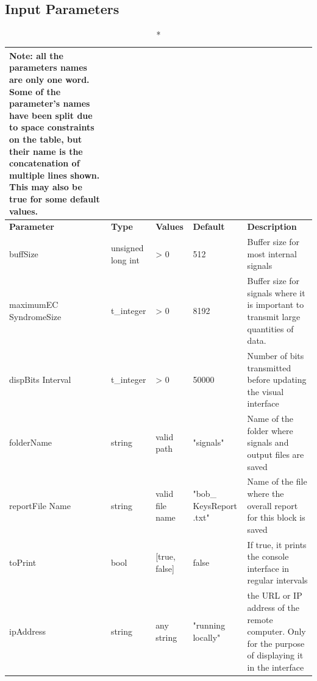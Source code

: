 

\subsection*{Input Parameters}


\begin{longtable}{|p{25mm}|p{20mm}|p{20mm}|p{20mm}|p{45mm}|}
	\caption*{\textbf{Note:} all the parameters names are only one word. Some of the parameter's names have been split due to space constraints on the table, but their name is the concatenation of multiple lines shown. This may also be true for some default values.}\label{table:bobQkd_in_par}\\	
	\hline
	\textbf{Parameter} & \textbf{Type} & \textbf{Values} &   \textbf{Default} & \textbf{Description}\\ \hline
	buffSize & unsigned long int & > 0 & 512 & Buffer size for most internal
	signals \\\hline
	maximumEC SyndromeSize & t\_integer & > 0 &  8192 & Buffer size for
	signals where it is important to transmit large quantities of data. \\\hline
	dispBits Interval & t\_integer & > 0 & 50000 & Number of bits transmitted
	before updating the visual interface \\\hline
	folderName & string & valid path & "signals" & Name of the folder where
	signals and output files are saved \\\hline
	reportFile Name & string & valid file name & "bob\_ KeysReport .txt" &
	Name of the file where the overall report for this block is saved
	\\\hline
	toPrint & bool & [true, false] & false & If true, it prints the console
	interface in regular intervals \\\hline
	ipAddress & string & any string & "running locally" & the URL or IP
	address of the remote computer. Only for the purpose of displaying it in the
	interface \\\hline
\end{longtable}

